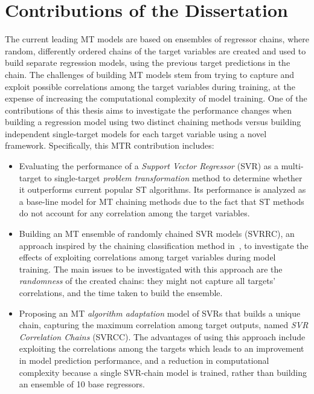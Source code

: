 \documentclass[reqno]{vcuthesis}
\newcommand{\iitem}{\item[-]}
\numberwithin{equation}{chapter}
\begin{document}
\section{Contributions of the Dissertation \label{sec:introcontribute} }
The current leading MT models are based on ensembles of regressor chains, where random, differently ordered chains of the target variables are created and used to build separate regression models, using the previous target predictions in the chain. The challenges of building MT models stem from trying to capture and exploit possible correlations among the target variables during training, at the expense of increasing the computational complexity of model training. One of the contributions of this thesis aims to investigate the performance changes when building a regression model using two distinct chaining methods versus building independent single-target models for each target variable using a novel framework. Specifically, this MTR contribution includes:
\begin{itemize}
\iitem Evaluating the performance of a \textit{Support Vector Regressor} (SVR) as a multi-target to single-target \textit{problem transformation} method to determine whether it outperforms current popular ST algorithms. Its performance is analyzed as a base-line model for MT chaining methods due to the fact that ST methods do not account for any correlation among the target variables.

\iitem Building an MT ensemble of randomly chained SVR models (SVRRC), an approach inspired by the chaining classification method in~\cite{Spyromitros2014}, to investigate the effects of exploiting correlations among target variables during model training. The main issues to be investigated with this approach are the \textit{randomness} of the created chains: they might not capture all targets' correlations, and the time taken to build the ensemble.

\iitem Proposing an MT \textit{algorithm adaptation} model of SVRs that builds a unique chain, capturing the maximum correlation among target outputs, named \textit{SVR Correlation Chains} (SVRCC). The advantages of using this approach include exploiting the correlations among the targets which leads to an improvement in model prediction performance, and a reduction in computational complexity because a single SVR-chain model is trained, rather than building an ensemble of 10 base regressors.
\end{itemize}
\end{document}
